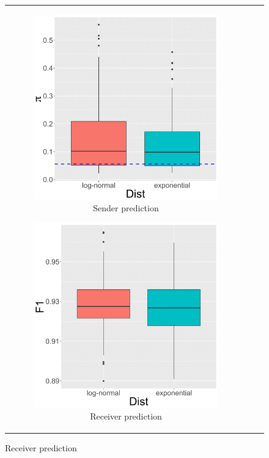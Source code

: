 \documentclass[ba]{imsart}
\numberwithin{equation}{section}
\theoremstyle{plain}
\begin{document}
	\begin{figure}[!t]
		\centering
		\begin{tabular}[t]{ccc}
			\begin{subfigure}[b]{0.33\textwidth}
				\caption{Sender prediction}
				\includegraphics[width=\textwidth]{img/senderpredict-1.png}	
			\end{subfigure}
			\begin{subfigure}[b]{0.33\textwidth}
				\caption{Receiver prediction}
				\includegraphics[width=\textwidth]{img/receiverpredict-1.png}	

\end{subfigure}
\end{tabular}
\end{figure}
\end{document}

